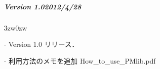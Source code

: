 
{\small

%

%
\subparagraph{Version 1.0\hspace{1cm}2012/4/28}

\begin{description}
\begin{indentation}{3zw}{0zw}
\item[-] Version 1.0 リリース．
\item[-] 利用方法のメモを追加 How\_to\_use\_PMlib.pdf
\end{indentation}
\end{description}
\vspace{3mm}


} %